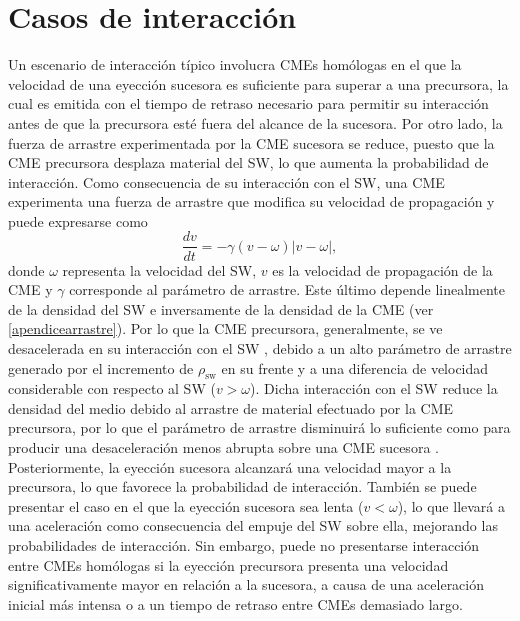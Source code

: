 \section{Casos de interacción}
\label{Casosdeinteracción}
Un escenario de interacción típico involucra CMEs homólogas en el que la velocidad de una eyección sucesora es suficiente para superar a una precursora, la cual es emitida con el tiempo de retraso necesario para permitir su interacción antes de que la precursora esté fuera del alcance de la sucesora. Por otro lado, la fuerza de arrastre experimentada por la CME sucesora se reduce, puesto que la CME precursora desplaza material del \ac{SW}, lo que aumenta la probabilidad de interacción. Como consecuencia de su interacción con el \ac{SW}, una CME experimenta una fuerza de arrastre que modifica su velocidad de propagación y puede expresarse como
\begin{equation}
\frac{dv}{dt}=-\gamma(v-\omega)|v-\omega|,
\label{arrastre1}
\end{equation}
donde $\omega$ representa la velocidad del \ac{SW}, $v$ es la velocidad de propagación de la CME y $\gamma$ corresponde al parámetro de arrastre. Este último depende linealmente de la densidad del \ac{SW} e inversamente de la densidad de la CME (ver \autoref{apendicearrastre}). Por lo que la CME precursora, generalmente, se ve desacelerada en su interacción con el SW \parencite[e.g.,][]{temmer-2012, gopalswamy-2000, cargill-2004, liu-2013}, debido a un alto parámetro de arrastre generado por el incremento de $\rho_\text{sw}$ en su frente y a una diferencia de velocidad considerable con respecto al \ac{SW} ($v>\omega$). Dicha interacción con el SW reduce la densidad del medio debido al arrastre de material efectuado por la CME precursora, por lo que el parámetro de arrastre disminuirá lo suficiente como para producir una desaceleración menos abrupta sobre una CME sucesora \parencite[e.g.,][]{lugaz-2005}. Posteriormente, la eyección sucesora alcanzará una velocidad mayor a la precursora, lo que favorece la probabilidad de interacción. También se puede presentar el caso en el que la eyección sucesora sea lenta ($v<\omega$), lo que llevará a una aceleración como consecuencia del empuje del SW sobre ella, mejorando las probabilidades de interacción. Sin embargo, puede no presentarse interacción entre CMEs homólogas si la eyección precursora presenta una velocidad significativamente mayor en relación a la sucesora, a causa de una aceleración inicial más intensa o a un tiempo de retraso entre CMEs demasiado largo.

